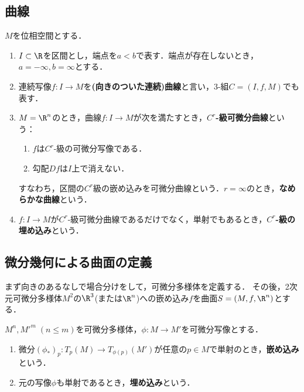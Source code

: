 \documentclass[uplatex,dvipdfmx]{jsreport}
\begin{document}
\subsection{曲線}

\begin{definition}
    $M$を位相空間とする．
    \begin{enumerate}
        \item $I\subset\R$を区間とし，端点を$a<b$で表す．端点が存在しないとき，$a=-\infty,b=\infty$とする．
        \item 連続写像$f:I\to M$を\textbf{(向きのついた連続)曲線}と言い，3-組$C=(I,f,M)$でも表す．
        \item $M=\R^n$のとき，曲線$f:I\to M$が次を満たすとき，\textbf{$C^r$-級可微分曲線}という：
        \begin{enumerate}
            \item $f$は$C^r$-級の可微分写像である．
            \item 勾配$Df$は$I$上で消えない．
        \end{enumerate}
        すなわち，区間の$C^r$級の嵌め込みを可微分曲線という．$r=\infty$のとき，\textbf{なめらかな曲線}という．
        \item $f:I\to M$が$C^r$-級可微分曲線であるだけでなく，単射でもあるとき，\textbf{$C^r$-級の埋め込み}という．
    \end{enumerate}
\end{definition}

\subsection{微分幾何による曲面の定義}

\begin{tcolorbox}[colframe=ForestGreen, colback=ForestGreen!10!white,breakable,colbacktitle=ForestGreen!40!white,coltitle=black,fonttitle=\bfseries\sffamily,
title=]
    まず向きのあるなしで場合分けをして，可微分多様体を定義する．
    その後，2次元可微分多様体$M^2$の$\R^3$(または$\R^n$)への嵌め込み$f$を曲面$S=(M,f,\R^n)$とする．
\end{tcolorbox}

\begin{definition}
    $M^n,M'^m\;(n\le m)$を可微分多様体，$\phi:M\to M'$を可微分写像とする．
    \begin{enumerate}
        \item 微分$(\phi_*)_p:T_p(M)\to T_{\phi(p)}(M')$が任意の$p\in M$で単射のとき，\textbf{嵌め込み}という．
        \item 元の写像$\phi$も単射であるとき，\textbf{埋め込み}という．
    \end{enumerate}
\end{definition}
\end{document}
